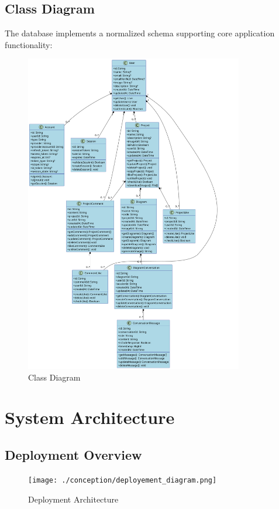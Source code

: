 \subsection{Class Diagram}

The database implements a normalized schema supporting core application functionality:

\begin{figure}[H]
  \centering
  \includegraphics[width=0.85\textwidth]{conception/SprintI/class_diagram2.png}
  \caption{Class Diagram}
  \label{fig:class_diagram}
\end{figure}
\section{System Architecture}

\subsection{Deployment Overview}

\begin{figure}[H]
    \centering
    \texttt{[image: ./conception/deployement\_diagram.png]}
    \caption{Deployment Architecture}
    \label{fig:deployment}
\end{figure}

